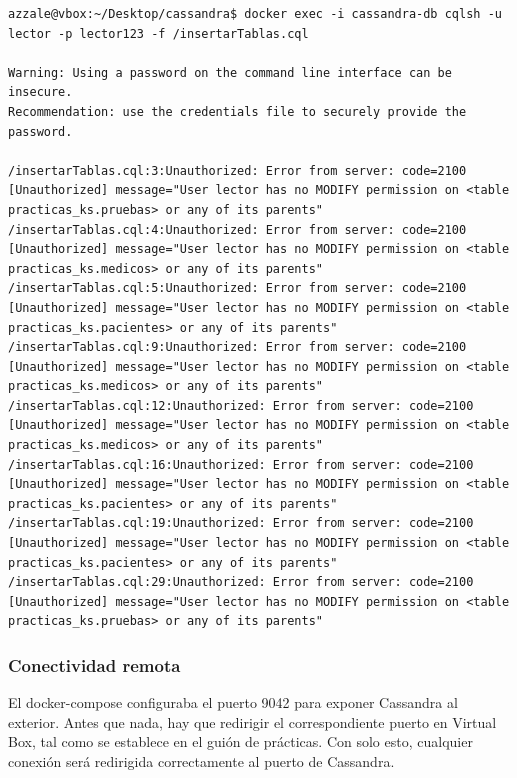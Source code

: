 \documentclass{article}
\begin{document}
\begin{tcolorbox}[colback=black, coltext=white, fontupper=\ttfamily, title=Terminal]
\begin{verbatim}
azzale@vbox:~/Desktop/cassandra$ docker exec -i cassandra-db cqlsh -u lector -p lector123 -f /insertarTablas.cql

Warning: Using a password on the command line interface can be insecure.
Recommendation: use the credentials file to securely provide the password.

/insertarTablas.cql:3:Unauthorized: Error from server: code=2100 [Unauthorized] message="User lector has no MODIFY permission on <table practicas_ks.pruebas> or any of its parents"
/insertarTablas.cql:4:Unauthorized: Error from server: code=2100 [Unauthorized] message="User lector has no MODIFY permission on <table practicas_ks.medicos> or any of its parents"
/insertarTablas.cql:5:Unauthorized: Error from server: code=2100 [Unauthorized] message="User lector has no MODIFY permission on <table practicas_ks.pacientes> or any of its parents"
/insertarTablas.cql:9:Unauthorized: Error from server: code=2100 [Unauthorized] message="User lector has no MODIFY permission on <table practicas_ks.medicos> or any of its parents"
/insertarTablas.cql:12:Unauthorized: Error from server: code=2100 [Unauthorized] message="User lector has no MODIFY permission on <table practicas_ks.medicos> or any of its parents"
/insertarTablas.cql:16:Unauthorized: Error from server: code=2100 [Unauthorized] message="User lector has no MODIFY permission on <table practicas_ks.pacientes> or any of its parents"
/insertarTablas.cql:19:Unauthorized: Error from server: code=2100 [Unauthorized] message="User lector has no MODIFY permission on <table practicas_ks.pacientes> or any of its parents"
/insertarTablas.cql:29:Unauthorized: Error from server: code=2100 [Unauthorized] message="User lector has no MODIFY permission on <table practicas_ks.pruebas> or any of its parents"

\end{verbatim}
\end{tcolorbox}

\subsubsection{Conectividad remota}

El docker-compose configuraba el puerto 9042 para exponer Cassandra al exterior.  Antes que nada, hay que redirigir el correspondiente puerto en Virtual Box, tal como se establece en el guión de prácticas. Con solo esto, cualquier conexión será redirigida correctamente al puerto de Cassandra.
\end{document}
